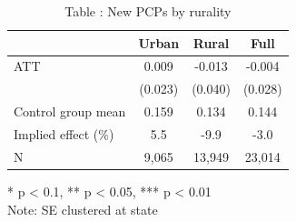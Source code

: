 \begin{table}[t]
\caption*{
{\fontsize{20}{25}\selectfont  Table : New PCPs by rurality\fontsize{12}{15}\selectfont }
} 
\fontsize{12.0pt}{14.0pt}\selectfont
\begin{tabular*}{\linewidth}{@{\extracolsep{\fill}}lccc}
\toprule
  & Urban & Rural & Full \\ 
\midrule\addlinespace[2.5pt]
ATT & 0.009 & -0.013 & -0.004 \\ 
 & (0.023) & (0.040) & (0.028) \\ 
Control group mean & 0.159 & 0.134 & 0.144 \\ 
Implied effect (\%) & 5.5 & -9.9 & -3.0 \\ 
N & 9,065 & 13,949 & 23,014 \\ 
\bottomrule
\end{tabular*}
\begin{minipage}{\linewidth}
* p < 0.1, ** p < 0.05, *** p < 0.01\\
Note: SE clustered at state\\
\end{minipage}
\end{table}

